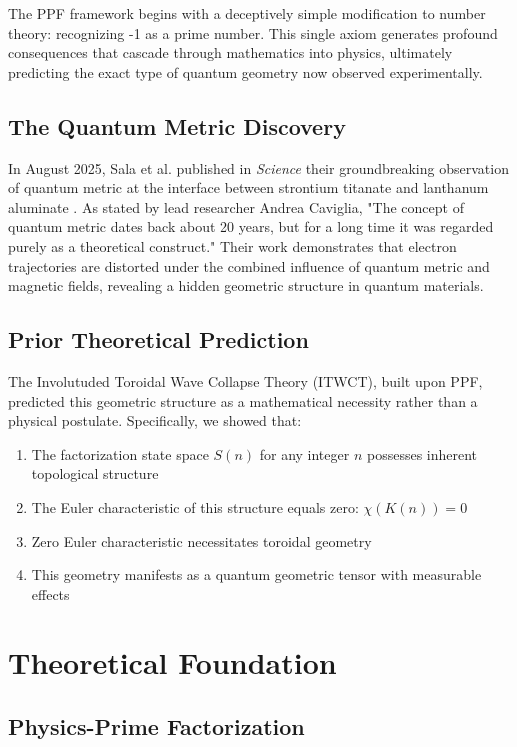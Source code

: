 \documentclass[conference]{IEEEtran}
\begin{document}
The PPF framework begins with a deceptively simple modification to number theory: recognizing -1 as a prime number. This single axiom generates profound consequences that cascade through mathematics into physics, ultimately predicting the exact type of quantum geometry now observed experimentally.

\subsection{The Quantum Metric Discovery}

In August 2025, Sala et al. published in \emph{Science} their groundbreaking observation of quantum metric at the interface between strontium titanate and lanthanum aluminate \cite{sala2025}. As stated by lead researcher Andrea Caviglia, "The concept of quantum metric dates back about 20 years, but for a long time it was regarded purely as a theoretical construct." Their work demonstrates that electron trajectories are distorted under the combined influence of quantum metric and magnetic fields, revealing a hidden geometric structure in quantum materials.

\subsection{Prior Theoretical Prediction}

The Involutuded Toroidal Wave Collapse Theory (ITWCT), built upon PPF, predicted this geometric structure as a mathematical necessity rather than a physical postulate. Specifically, we showed that:

\begin{enumerate}
\item The factorization state space $S(n)$ for any integer $n$ possesses inherent topological structure
\item The Euler characteristic of this structure equals zero: $\chi(K(n)) = 0$
\item Zero Euler characteristic necessitates toroidal geometry
\item This geometry manifests as a quantum geometric tensor with measurable effects
\end{enumerate}

\section{Theoretical Foundation}

\subsection{Physics-Prime Factorization}
\end{document}
